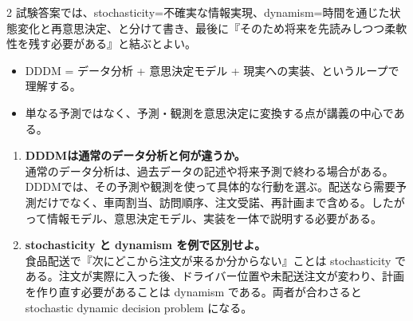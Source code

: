 \begin{multicols}{2}
試験答案では、stochasticity=不確実な情報実現、dynamism=時間を通じた状態変化と再意思決定、と分けて書き、最後に『そのため将来を先読みしつつ柔軟性を残す必要がある』と結ぶとよい。\par
{}
\begin{itemize}
\item DDDM = データ分析 + 意思決定モデル + 現実への実装、というループで理解する。
\item 単なる予測ではなく、予測・観測を意思決定に変換する点が講義の中心である。
\end{itemize}
\begin{enumerate}
\item \textbf{DDDMは通常のデータ分析と何が違うか。}\\通常のデータ分析は、過去データの記述や将来予測で終わる場合がある。DDDMでは、その予測や観測を使って具体的な行動を選ぶ。配送なら需要予測だけでなく、車両割当、訪問順序、注文受諾、再計画まで含める。したがって情報モデル、意思決定モデル、実装を一体で説明する必要がある。
\item \textbf{stochasticity と dynamism を例で区別せよ。}\\食品配送で『次にどこから注文が来るか分からない』ことは stochasticity である。注文が実際に入った後、ドライバー位置や未配送注文が変わり、計画を作り直す必要があることは dynamism である。両者が合わさると stochastic dynamic decision problem になる。
\end{enumerate}
\end{multicols}


